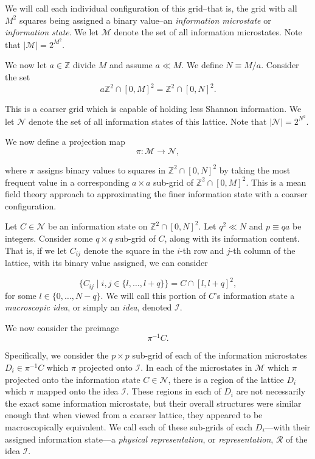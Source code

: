 \documentclass{article}
\begin{document}
We will call each individual configuration of this grid–that is, the grid with all $M^2$ squares being assigned a binary value–an \emph{information microstate} or \emph{information state}. We let $\mathcal{M}$ denote the set of all information microstates. Note that $|\mathcal{M}|=2^{M^2}$.

We now let $a\in\mathbb{Z}$ divide $M$ and assume $a\ll M$. We define $N\equiv M/a$. Consider the set \[ a\mathbb{Z}^2\cap[0,M]^2 = \mathbb{Z}^2\cap[0,N]^2. \] 

This is a coarser grid which is capable of holding less Shannon information. We let $\mathcal{N}$ denote the set of all information states of this lattice. Note that $|\mathcal{N}|=2^{N^2}$.

We now define a projection map \[ \pi:\mathcal{M}\to\mathcal{N}, \]

where $\pi$ assigns binary values to squares in $\mathbb{Z}^2\cap[0,N]^2$ by taking the most frequent value in a corresponding $a\times a$ sub-grid of $\mathbb{Z}^2\cap[0,M]^2$. This is a mean field theory approach to approximating the finer information state with a coarser configuration.\newline

Let $C\in\mathcal{N}$ be an information state on $\mathbb{Z}^2\cap[0,N]^2$. Let $q^2\ll N$ and $p\equiv qa$ be integers. Consider some $q\times q$ sub-grid  of $C$, along with its information content. That is, if we let $C_{ij}$ denote the square in the $i$-th row and $j$-th column of the lattice, with its binary value assigned, we can consider  

\[ \{C_{ij}\mid i,j\in\{l,\dots, l+q\} \} = C\cap[l,l+q]^2, \] for some $l\in \{0,\dots, N-q\}$. We will call this portion of $C$'s information state a \emph{macroscopic idea}, or simply an \emph{idea}, denoted $\mathcal{I}$. 

We now consider the preimage \[\pi^{-1}C.\]

Specifically, we consider the $p\times p$ sub-grid of each of the information microstates $D_i\in\pi^{-1}C$ which $\pi$ projected onto $\mathcal{I}$. In each of the microstates in $\mathcal{M}$ which $\pi$ projected onto the information state $C\in\mathcal{N}$, there is a region of the lattice $D_i$ which $\pi$ mapped onto the idea $\mathcal{I}$. These regions in each of $D_i$ are not necessarily the exact same information microstate, but their overall structures were similar enough that when viewed from a coarser lattice, they appeared to be macroscopically equivalent. We call each of these sub-grids of each $D_i$––with their assigned information state––a \emph{physical representation}, or \emph{representation}, $\mathcal{R}$ of the idea $\mathcal{I}$. 
\end{document}
